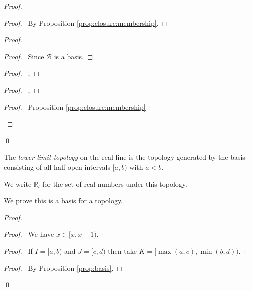 \begin{proof}
  \pf
  \begin{proof}
    \pf\ By Proposition \ref{prop:closure:membership}.
  \end{proof}
  \begin{proof}
    \begin{proof}
      \pf\ Since $\mathcal{B}$ is a basis.
    \end{proof}
    \begin{proof}
      \pf\ , 
    \end{proof}
    \begin{proof}
      \pf\ , 
    \end{proof}
    \qedstep
    \begin{proof}
      \pf\ Proposition \ref{prop:closure:membership}
    \end{proof}
  \end{proof}
  \qed
\end{proof}

\begin{df}
  The \emph{lower limit topology} on the real line is the topology generated by the basis consisting of all half-open intervals $[a,b)$ with $a < b$.

  We write $\mathbb{R}_l$ for the set of real numbers under this topology.

  We prove this is a basis for a topology.
\end{df}

\begin{proof}
  \pf
  \begin{proof}
    \pf\ We have $x \in [x, x+1)$.
  \end{proof}
  \begin{proof}
    \pf\ If $I = [a, b)$ and $J = [c, d)$ then take $K = [\max(a,c), \min(b,d))$.
  \end{proof}
  \qedstep
  \begin{proof}
    \pf\ By Proposition \ref{prop:basis}.
  \end{proof}
  \qed
\end{proof}

